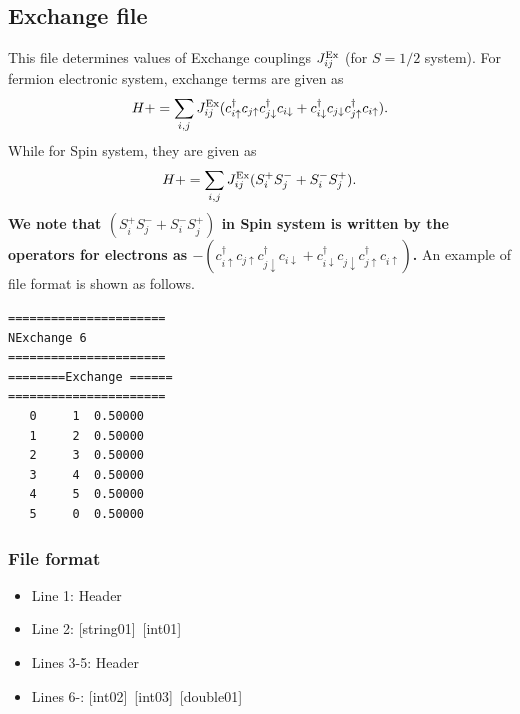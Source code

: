 \subsection{Exchange file}
This file determines values of Exchange couplings $J_{ij}^{\rm Ex}$ {(for $S=1/2$ system)}.
For fermion electronic system, exchange terms are given as
\begin{equation}
H+=\sum_{i,j}J_{ij}^{\rm Ex} (c_ {i \uparrow}^{\dag}c_{j\uparrow}c_{j \downarrow}^{\dag}c_{i  \downarrow}+c_ {i \downarrow}^{\dag}c_{j\downarrow}c_{j \uparrow}^{\dag}c_{i  \uparrow}).
\end{equation}
While for Spin system, they are given as
\begin{equation}
H+=\sum_{i,j}J_{ij}^{\rm Ex} (S_ {i}^{+}S_{j}^-+ S_ {i}^{-}S_{j}^+).
\end{equation}
{\bf We note that $(S_i^+S_j^-+S_i^-S_j^+)$ in Spin system is written by the
operators for electrons as 
$-(c_ {i \uparrow}^{\dag}c_{j\uparrow}c_{j \downarrow}^{\dag}c_{i  \downarrow}
+c_ {i \downarrow}^{\dag}c_{j\downarrow}c_{j \uparrow}^{\dag}c_{i  \uparrow})$.
}
An example of file format is shown as follows.

\begin{minipage}{12.5cm}
\begin{screen}
\begin{verbatim}
====================== 
NExchange 6  
====================== 
========Exchange ====== 
====================== 
   0     1  0.50000
   1     2  0.50000
   2     3  0.50000
   3     4  0.50000
   4     5  0.50000
   5     0  0.50000
\end{verbatim}
\end{screen}
\end{minipage}

\subsubsection{File format}
 \begin{itemize}
   \item  Line 1:  Header
   \item  Line 2:   [string01]~[int01]
   \item  Lines 3-5:  Header
   \item  Lines 6-: 
   [int02]~[int03]~[double01] 
  \end{itemize}
